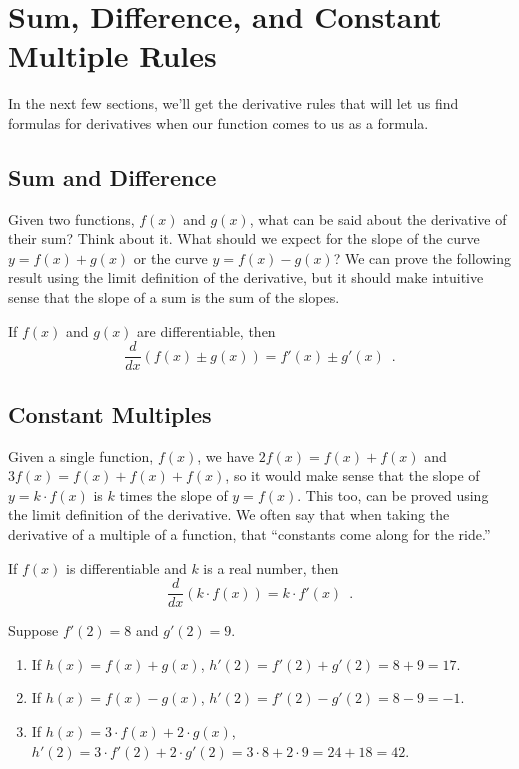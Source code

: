 \section{Sum, Difference, and Constant Multiple Rules}
\label{sec:sumdiff}

In the next few sections, we'll get the derivative rules that will let us find formulas for derivatives when our function comes to us as a formula.

\subsection{Sum and Difference}
Given two functions, $f(x)$ and $g(x)$, what can be said about the derivative of their sum? Think about it. What should we expect for the slope of the curve $y = f(x)+g(x)$ or the curve $y=f(x) - g(x)$? We can prove the following result using the limit definition of the derivative, but it should make intuitive sense that the slope of a sum is the sum of the slopes.

\begin{theorem}
\label{thm:sumdiffderiv}
If $f(x)$ and $g(x)$ are differentiable, then
    $$\dfrac{d}{dx}(f(x) \pm g(x))=f'(x) \pm g'(x) \enspace .$$
\end{theorem}

\subsection{Constant Multiples}
Given a single function, $f(x)$, we have $2f(x) = f(x) + f(x)$ and $3f(x) = f(x) + f(x) + f(x)$, so it would make sense that the slope of $y=k\cdot f(x)$ is $k$ times the slope of $y=f(x)$. This too, can be proved using the limit definition of the derivative. We often say that when taking the derivative of a multiple of a function, that ``constants come along for the ride.''

\begin{theorem}
\label{thm:constmultderiv}
If $f(x)$ is differentiable and $k$ is a real number, then
$$\dfrac{d}{dx}(k\cdot f(x))=k\cdot f'(x) \enspace .$$
\end{theorem}

\begin{example}
    Suppose $f'(2) = 8$ and $g'(2) = 9$.
    \begin{enumerate}
    \item If $h(x) = f(x) + g(x)$, $h'(2) = f'(2) + g'(2) = 8+9 = 17$.
    \item If $h(x) = f(x) - g(x)$, $h'(2) = f'(2) - g'(2) = 8-9 = -1$.
    \item If $h(x) = 3\cdot f(x) + 2\cdot g(x)$, $h'(2)= 3\cdot f'(2) + 2\cdot g'(2) = 3\cdot 8 + 2\cdot 9 =24+18 = 42$.
    \end{enumerate}
\end{example}

